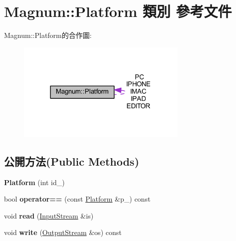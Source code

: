 \hypertarget{class_magnum_1_1_platform}{}\section{Magnum\+:\+:Platform 類別 參考文件}
\label{class_magnum_1_1_platform}


Magnum\+:\+:Platform的合作圖\+:\nopagebreak
\begin{figure}[H]
\begin{center}
\leavevmode
\includegraphics[width=231pt]{class_magnum_1_1_platform__coll__graph}
\end{center}
\end{figure}
\subsection*{公開方法(Public Methods)}
\begin{DoxyCompactItemize}
\item 
{\bfseries Platform} (int id\+\_)\hypertarget{class_magnum_1_1_platform_ae04148f3b996b26e5bc53fdd3211afab}{}\label{class_magnum_1_1_platform_ae04148f3b996b26e5bc53fdd3211afab}

\item 
bool {\bfseries operator==} (const \hyperlink{class_magnum_1_1_platform}{Platform} \&p\+\_\+) const \hypertarget{class_magnum_1_1_platform_ade5bbc559264bfc0201994d937c52356}{}\label{class_magnum_1_1_platform_ade5bbc559264bfc0201994d937c52356}

\item 
void {\bfseries read} (\hyperlink{class_magnum_1_1_input_stream}{Input\+Stream} \&is)\hypertarget{class_magnum_1_1_platform_ae9e640d266d2e57e6231e0e324198101}{}\label{class_magnum_1_1_platform_ae9e640d266d2e57e6231e0e324198101}

\item 
void {\bfseries write} (\hyperlink{class_magnum_1_1_output_stream}{Output\+Stream} \&os) const \hypertarget{class_magnum_1_1_platform_a812ad5eb3221e9ff0566b42bc127dcbf}{}\label{class_magnum_1_1_platform_a812ad5eb3221e9ff0566b42bc127dcbf}

\end{DoxyCompactItemize}
